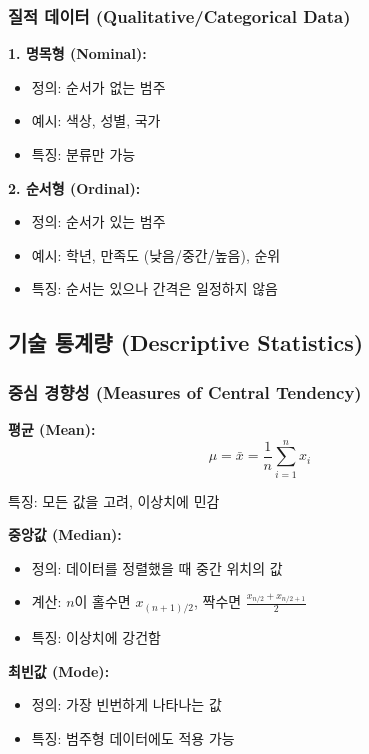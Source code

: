 \documentclass[12pt,a4paper]{article}
\begin{document}
\subsubsection{질적 데이터 (Qualitative/Categorical Data)}

\textbf{1. 명목형 (Nominal):}
\begin{itemize}
    \item 정의: 순서가 없는 범주
    \item 예시: 색상, 성별, 국가
    \item 특징: 분류만 가능
\end{itemize}

\textbf{2. 순서형 (Ordinal):}
\begin{itemize}
    \item 정의: 순서가 있는 범주
    \item 예시: 학년, 만족도 (낮음/중간/높음), 순위
    \item 특징: 순서는 있으나 간격은 일정하지 않음
\end{itemize}

\subsection{기술 통계량 (Descriptive Statistics)}

\subsubsection{중심 경향성 (Measures of Central Tendency)}

\textbf{평균 (Mean):}
\[
\mu = \bar{x} = \frac{1}{n}\sum_{i=1}^{n} x_i
\]

특징: 모든 값을 고려, 이상치에 민감

\textbf{중앙값 (Median):}
\begin{itemize}
    \item 정의: 데이터를 정렬했을 때 중간 위치의 값
    \item 계산: $n$이 홀수면 $x_{(n+1)/2}$, 짝수면 $\frac{x_{n/2} + x_{n/2+1}}{2}$
    \item 특징: 이상치에 강건함
\end{itemize}

\textbf{최빈값 (Mode):}
\begin{itemize}
    \item 정의: 가장 빈번하게 나타나는 값
    \item 특징: 범주형 데이터에도 적용 가능
\end{itemize}
\end{document}

